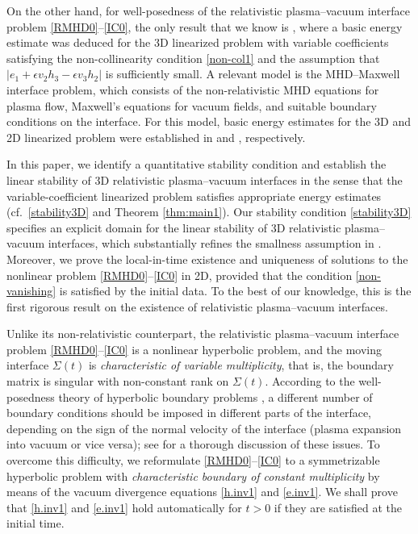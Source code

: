 \documentclass[twoside,11pt]{article}
\numberwithin{equation}{section}
\begin{document}
On the other hand, for well-posedness of the relativistic plasma--vacuum interface problem \eqref{RMHD0}--\eqref{IC0},
the only result that we know is \cite[Theorem 4.2]{T12MR2974767}, where a basic energy estimate was deduced for the 3D linearized problem with variable coefficients satisfying the non-collinearity condition \eqref{non-col1} and the assumption that $|e_1+\epsilon v_2h_3-\epsilon v_3h_2|$ is sufficiently small.
A relevant model is the MHD--Maxwell interface problem, which consists of the non-relativistic MHD equations for plasma flow, Maxwell's equations for vacuum fields, and suitable boundary conditions on the interface.
For this model, basic energy estimates for the 3D and 2D linearized problem were established in \cite{MT14MR3194371,CDS14MR3248397,MSTT20MR4124205} and \cite{CDS16MR3527627,T24MR4793931}, respectively.


{In this paper, we identify a quantitative stability condition and establish the linear stability of 3D relativistic plasma--vacuum interfaces in the sense that the variable-coefficient linearized problem satisfies appropriate energy estimates (cf.~\eqref{stability3D} and Theorem \ref{thm:main1}).}
Our stability condition \eqref{stability3D} specifies an explicit domain for the linear stability of 3D relativistic plasma--vacuum interfaces, which substantially refines the smallness assumption in \cite[Theorem 4.2]{T12MR2974767}.
Moreover, we prove the local-in-time existence and uniqueness of solutions to the nonlinear problem \eqref{RMHD0}--\eqref{IC0} in 2D, provided that the condition \eqref{non-vanishing} is satisfied by the initial data.
To the best of our knowledge, this is the first rigorous result on the existence of relativistic plasma--vacuum interfaces.


Unlike its non-relativistic counterpart, the relativistic plasma--vacuum interface problem \eqref{RMHD0}--\eqref{IC0} is a nonlinear hyperbolic problem, and the moving interface $\Sigma(t)$ is {\it characteristic of variable multiplicity}, that is, the boundary matrix is singular with non-constant rank on $\Sigma(t)$.
According to the well-posedness theory of hyperbolic boundary problems \cite{BGS07MR2284507,CP82MR0678605}, a different number of boundary conditions should be imposed in different parts of the interface, depending on the sign of the normal velocity of the interface (plasma expansion into vacuum or vice versa); see \cite{T12MR2974767, T24MR4793931,CDS14MR3248397} for a thorough discussion of these issues.
To overcome this difficulty, we reformulate \eqref{RMHD0}--\eqref{IC0} to a symmetrizable hyperbolic problem with {\it characteristic boundary of constant multiplicity} by means of the vacuum divergence equations \eqref{h.inv1} and \eqref{e.inv1}. We shall prove that \eqref{h.inv1} and \eqref{e.inv1}  hold automatically for $t>0$ if they are satisfied at the initial time.
\end{document}

